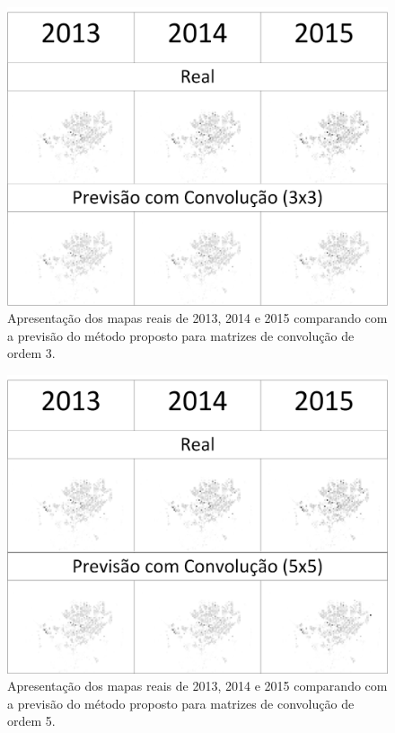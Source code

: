 \begin{figure}[H]
	\centering	
	\includegraphics[scale=0.29
	]{Figuras/3x3vsReal.png}
	\caption{Apresentação dos mapas reais de 2013, 2014 e 2015 comparando com a previsão do método proposto para matrizes de convolução de ordem 3.}
	\label{fig:Results3x3}
\end{figure}
\begin{figure}[H]
	\centering	
	\includegraphics[scale=0.29]{Figuras/5x5vsReal.png}
	\caption{Apresentação dos mapas reais de 2013, 2014 e 2015 comparando com a previsão do método proposto para matrizes de convolução de ordem 5. }
	\label{fig:Results5x5}
\end{figure}
